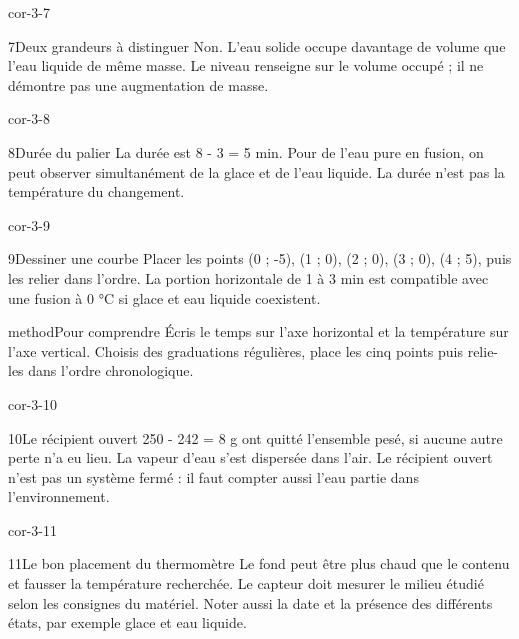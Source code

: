 \documentclass[12pt,twoside,openany]{book}
\begin{document}
\begin{blocLivre}{cor-3-7}
\begin{corrige}{7}{Deux grandeurs à distinguer}
Non. L’eau solide occupe davantage de volume que l’eau liquide de même masse. Le niveau renseigne sur le volume occupé ; il ne démontre pas une augmentation de masse.\par
{}
\end{corrige}\end{blocLivre}
\begin{blocLivre}{cor-3-8}
\begin{corrige}{8}{Durée du palier}
La durée est 8 - 3 = 5 min. Pour de l’eau pure en fusion, on peut observer simultanément de la glace et de l’eau liquide. La durée n’est pas la température du changement.\par
\end{corrige}\end{blocLivre}
\begin{blocLivre}{cor-3-9}
\begin{corrige}{9}{Dessiner une courbe}
Placer les points (0 ; -5), (1 ; 0), (2 ; 0), (3 ; 0), (4 ; 5), puis les relier dans l’ordre. La portion horizontale de 1 à 3 min est compatible avec une fusion à 0 °C si glace et eau liquide coexistent.\par
\begin{pcEncadre}{method}{Pour comprendre}
Écris le temps sur l’axe horizontal et la température sur l’axe vertical. Choisis des graduations régulières, place les cinq points puis relie-les dans l’ordre chronologique.\par
\end{pcEncadre}
\end{corrige}\end{blocLivre}
\begin{blocLivre}{cor-3-10}
\begin{corrige}{10}{Le récipient ouvert}
250 - 242 = 8 g ont quitté l’ensemble pesé, si aucune autre perte n’a eu lieu. La vapeur d’eau s’est dispersée dans l’air. Le récipient ouvert n’est pas un système fermé : il faut compter aussi l’eau partie dans l’environnement.\par
\end{corrige}\end{blocLivre}
\begin{blocLivre}{cor-3-11}
\begin{corrige}{11}{Le bon placement du thermomètre}
Le fond peut être plus chaud que le contenu et fausser la température recherchée. Le capteur doit mesurer le milieu étudié selon les consignes du matériel. Noter aussi la date et la présence des différents états, par exemple glace et eau liquide.\par
\end{corrige}\end{blocLivre}
\end{document}
